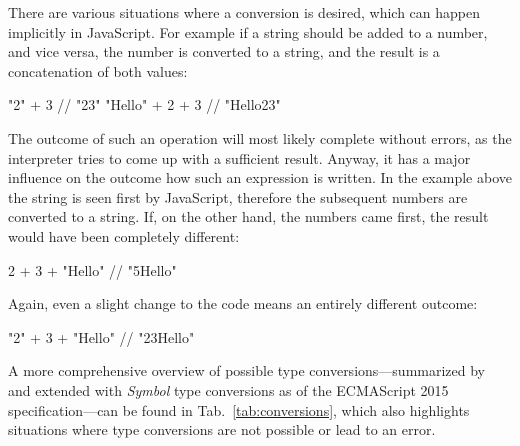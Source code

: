 \noindent
There are various situations where a conversion is desired, which can happen implicitly in JavaScript. For example if a string should be added to a number, and vice versa, the number is converted to a string, and the result is a concatenation of both values:
\begin{JsCode}[numbers=none]
"2" + 3 // "23"
"Hello" + 2 + 3 // "Hello23"
\end{JsCode}
The outcome of such an operation will most likely complete without errors, as the interpreter tries to come up with a sufficient result. Anyway, it has a major influence on the outcome how such an expression is written. In the example above the string is seen first by JavaScript, therefore the subsequent numbers are converted to a string. If, on the other hand, the numbers came first, the result would have been completely different:
\begin{JsCode}[numbers=none]
2 + 3 + "Hello" // "5Hello"
\end{JsCode}
Again, even a slight change to the code means an entirely different outcome:
\begin{JsCode}[numbers=none]
"2" + 3 + "Hello" // "23Hello"
\end{JsCode}
A more comprehensive overview of possible type conversions---summarized by \citeauthor{JavaScriptTheDefinitiveGuide:Flanagan:2011} and extended with \emph{Symbol} type conversions as of the ECMAScript 2015 specification---can be found in Tab.~\ref{tab:conversions}, which also highlights situations where type conversions are not possible or lead to an error.

